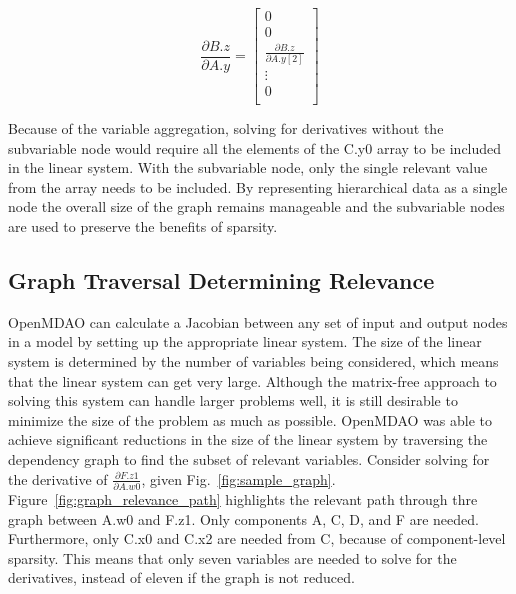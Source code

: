 \documentclass[]{aiaa-tc} %
\begin{document}
    \begin{equation}
        \frac{\partial B.z}{\partial A.y} =
        \begin{bmatrix}
            0 \\
            0 \\
            \frac{\partial B.z}{\partial A.y[2]} \\
            \vdots \\
            0 \\
        \end{bmatrix}
        \label{eqn:sparse_gradient}
    \end{equation}

    Because of the variable aggregation, solving for derivatives without the subvariable node would require
    all the elements of the C.y0 array to be included in the linear system.
    With the subvariable node, only the single relevant value from the array needs to be included.
    By representing hierarchical data as a single node the overall size of the graph
    remains manageable and the subvariable nodes are used to preserve the benefits of sparsity.


    \subsection{Graph Traversal Determining Relevance}
    \label{sec:determing relevance}

        OpenMDAO can calculate a Jacobian between any set of input and output nodes in a
        model by setting up the appropriate linear system. The size of the linear system
        is determined by the number of variables being considered, which means that the linear
        system can get very large. Although the matrix-free approach to solving this system
        can handle larger problems well, it is still desirable to minimize the size of the problem
        as much as possible. OpenMDAO was able to achieve significant reductions in the
        size of the linear system by traversing the dependency graph to find the subset of relevant variables.
        Consider solving for the derivative of $\frac{\partial F.z1}{\partial A.w0}$, given Fig.~\ref{fig:sample_graph}.
        Figure~\ref{fig:graph_relevance_path} highlights the relevant path through thre graph between A.w0 and F.z1.
        Only components A, C, D, and F are needed. Furthermore, only C.x0 and C.x2 are needed from C, because of component-level sparsity.
        This means that only seven variables are needed to solve for the derivatives,
        instead of eleven if the graph is not reduced.
\end{document}

